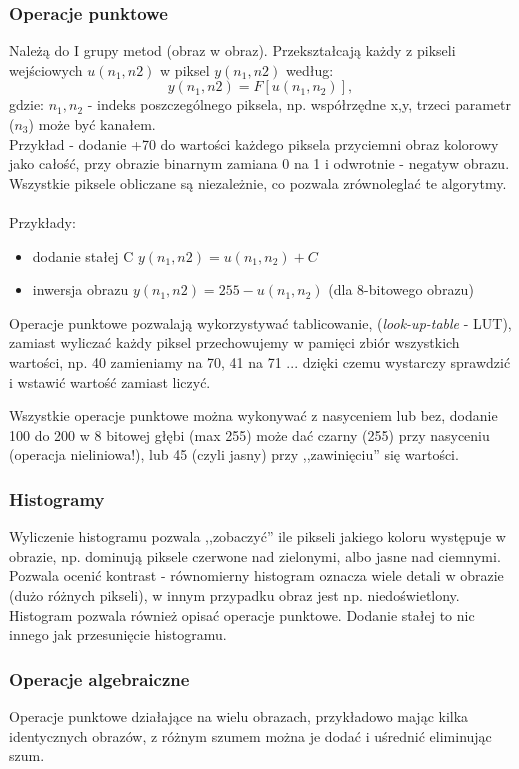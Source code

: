 \documentclass[a4paper,twoside]{report}
\begin{document}
\subsubsection{Operacje punktowe}
Należą do I grupy metod (obraz w obraz). Przekształcają każdy z pikseli wejściowych $ u(n_1,n2) $ w piksel $ y(n_1,n2) $ według:
$$ y(n_1,n2) = F[u(n_1,n_2)], $$
gdzie: $n_1, n_2 $ - indeks poszczególnego piksela, np. współrzędne x,y, trzeci parametr ($n_3$) może być kanałem.\\
Przykład - dodanie +70 do wartości każdego piksela przyciemni obraz kolorowy jako całość, przy obrazie binarnym zamiana 0 na 1 i odwrotnie - negatyw obrazu.
Wszystkie piksele obliczane są niezależnie, co pozwala zrównoleglać te algorytmy.\\\\
Przykłady:
\begin{itemize}
	\item dodanie stałej C $ y(n_1,n2) = u(n_1,n_2) + C $
	\item inwersja obrazu  $ y(n_1,n2) = 255 - u(n_1,n_2) $ (dla 8-bitowego obrazu)
\end{itemize} 
Operacje punktowe pozwalają wykorzystywać tablicowanie, (\textit{look-up-table} - LUT), zamiast wyliczać każdy piksel przechowujemy w pamięci zbiór wszystkich wartości, np. 40 zamieniamy na 70, 41 na 71 ... dzięki czemu wystarczy sprawdzić i wstawić wartość zamiast liczyć.

Wszystkie operacje punktowe można wykonywać z nasyceniem lub bez, dodanie 100 do 200 w 8 bitowej głębi (max 255) może dać czarny (255) przy nasyceniu (operacja nieliniowa!), lub 45 (czyli jasny) przy ,,zawinięciu'' się wartości.
\subsubsection{Histogramy}
Wyliczenie histogramu pozwala ,,zobaczyć'' ile pikseli jakiego koloru występuje w obrazie, np. dominują piksele czerwone nad zielonymi, albo jasne nad ciemnymi.
Pozwala ocenić kontrast - równomierny histogram oznacza wiele detali w obrazie (dużo różnych pikseli), w innym przypadku obraz jest np. niedoświetlony. Histogram pozwala również opisać operacje punktowe. Dodanie stałej to nic innego jak przesunięcie histogramu.
\subsubsection{Operacje algebraiczne}
Operacje punktowe działające na wielu obrazach, przykładowo mając kilka identycznych obrazów, z różnym szumem można je dodać i uśrednić eliminując szum.
\end{document}
